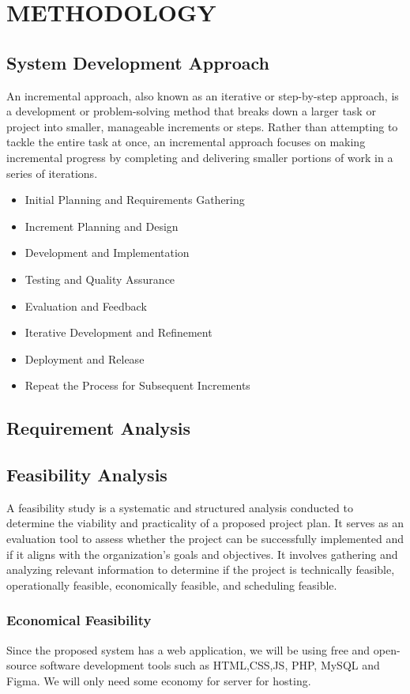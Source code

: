 \chapter{METHODOLOGY}
\section{System Development Approach}
An incremental approach, also known as an iterative or step-by-step approach, is a development or problem-solving method that breaks down a larger task or project into smaller, manageable increments or steps. Rather than attempting to tackle the entire task at once, an incremental approach focuses on making incremental progress by completing and delivering smaller portions of work in a series of iterations.
\begin{itemize}
    \setlength\itemsep{0.25em}
    \item Initial Planning and Requirements Gathering
    \item Increment Planning and Design
    \item Development and Implementation
    \item Testing and Quality Assurance
    \item Evaluation and Feedback
    \item Iterative Development and Refinement
    \item Deployment and Release
    \item Repeat the Process for Subsequent Increments
\end{itemize}
\section{Requirement Analysis}
\section{Feasibility Analysis}
A feasibility study is a systematic and structured analysis conducted to determine the viability and practicality of a proposed project plan. It serves as an evaluation tool to assess whether the project can be successfully implemented and if it aligns with the organization's goals and objectives. It involves gathering and analyzing relevant information to determine if the project is technically feasible, operationally feasible, economically feasible, and scheduling feasible.
\subsection{Economical Feasibility}
Since the proposed system has a web application, we will be using free and open-source software development tools such as HTML,CSS,JS, PHP, MySQL and Figma. We will only need some economy for server for hosting.

